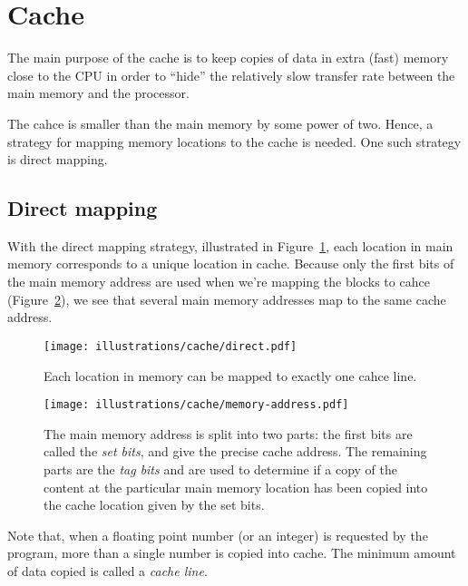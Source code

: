 
\section{Cache} %
\label{sec:cache}

The main purpose of the cache is to keep copies of data in extra (fast) memory close to the CPU in order to ``hide'' the relatively slow transfer rate between the main memory and the processor.

The cahce is smaller than the main memory by some power of two. Hence, a strategy for mapping memory locations to the cache is needed. One such strategy is direct mapping.

\subsection{Direct mapping} %
\label{sub:direct_mapping}

With the direct mapping strategy, illustrated in Figure~\ref{fig:direct}, each location in main memory corresponds to a unique location in cache. Because only the first bits of the main memory address are used when we're mapping the blocks to cahce (Figure~\ref{fig:address}), we see that several main memory addresses map to the same cache address.

\begin{figure}[htbp]
  \centering
  \texttt{[image: illustrations/cache/direct.pdf]}
  \caption{Each location in memory can be mapped to exactly one cahce line.}
  \label{fig:direct}
\end{figure}

\begin{figure}[htbp]
  \centering
  \texttt{[image: illustrations/cache/memory-address.pdf]}
  \caption{The main memory address is split into two parts: the first bits are called the \emph{set bits}, and give the precise cache address. The remaining parts are the \emph{tag bits} and are used to determine if a copy of the content at the particular main memory location has been copied into the cache location given by the set bits.}
  \label{fig:address}
\end{figure}

Note that, when a floating point number (or an integer) is requested by the program, more than a single number is copied into cache. The minimum amount of data copied is called a \emph{cache line}.

